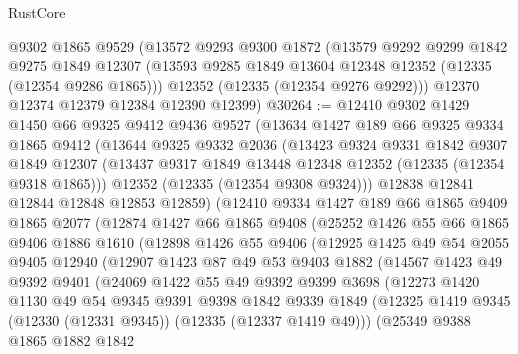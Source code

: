 \begin{lexlean}{RustCore}
\begin{coremodule}
    @9302
    @1865
    @9529
    (@13572
      @9293
      @9300
      @1872
      (@13579
        @9292
        @9299
        @1842
        @9275
        @1849
        @12307
        (@13593 @9285 @1849 @13604 @12348 @12352 (@12335 (@12354 @9286 @1865)))
        @12352
        (@12335 (@12354 @9276 @9292)))
      @12370
      @12374
      @12379
      @12384
      @12390
      @12399)
@30264 := @12410
    @9302
    @1429
    @1450
    @66
    @9325
    @9412
    @9436
    @9527
    (@13634
      @1427
      @189
      @66
      @9325
      @9334
      @1865
      @9412
      (@13644
        @9325
        @9332
        @2036
        (@13423
          @9324
          @9331
          @1842
          @9307
          @1849
          @12307
          (@13437 @9317 @1849 @13448 @12348 @12352 (@12335 (@12354 @9318 @1865)))
          @12352
          (@12335 (@12354 @9308 @9324)))
        @12838
        @12841
        @12844
        @12848
        @12853
        @12859)
      (@12410
        @9334
        @1427
        @189
        @66
        @1865
        @9409
        @1865
        @2077
        (@12874
          @1427
          @66
          @1865
          @9408
          (@25252
            @1426
            @55
            @66
            @1865
            @9406
            @1886
            @1610
            (@12898
              @1426
              @55
              @9406
              (@12925
                @1425
                @49
                @54
                @2055
                @9405
                @12940
                (@12907
                  @1423
                  @87
                  @49
                  @53
                  @9403
                  @1882
                  (@14567
                    @1423
                    @49
                    @9392
                    @9401
                    (@24069
                      @1422
                      @55
                      @49
                      @9392
                      @9399
                      @3698
                      (@12273
                        @1420
                        @1130
                        @49
                        @54
                        @9345
                        @9391
                        @9398
                        @1842
                        @9339
                        @1849
                        (@12325 @1419 @9345 (@12330 (@12331 @9345)) (@12335 (@12337 @1419 @49)))
                        (@25349
                          @9388
                          @1865
                          @1882
                          @1842

\end{coremodule}
\end{lexlean}
